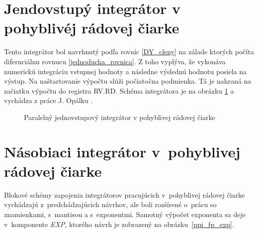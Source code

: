 \newpage
\section{Jendovstupý integrátor v pohyblivéj rádovej čiarke}
Tento integrátor bol navrhnutý podľa rovníc \eqref{DY_cleny} na zálade ktorých počíta difernciálnu rovnucu \eqref{jednoducha_rovnica}. Z toho vyplýva, že vykonáva numerickú integráciu vstupnej hodnoty a následne výslednú hodnotu posiela na výstup. Na naštartovanie výpočtu slúži počiatočna podmienka. Tá je nahraná na začiatku výpočtu do registra RV.RD.
Schéma integrátora je na obrázku \ref{ppi_fp} a vychádza z práce J. Opálku \cite{OpalkaBP}.

\bigskip
\begin{figure}[h]
\centering
{}
\caption{Paralelný jednovstupový integrátor v pohyblivej rádovej čiarke}
\label{ppi_fp}
\end{figure}
\bigskip

\section{Násobiaci integrátor v~pohyblivej rádovej čiarke}
Blokové schémy zapojenia integrátorov pracujúcich v~pohyblivej rádovej čiarke vychádzajú z~predchádzajúcich návrhov, ale boli rozšírené o~prácu so znamienkami, s~mantisou a s~exponentmi. Samotný výpočet exponenta sa deje v~komponente \textit{EXP}, ktorého návrh je zobrazený na obrázku~\ref{ppi_fp_exp}.

